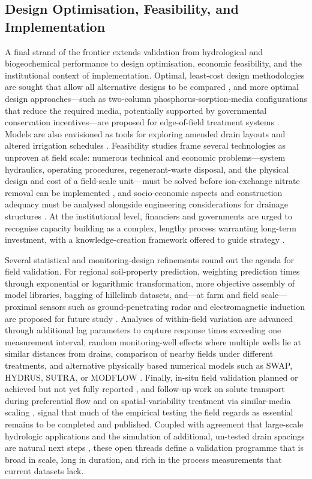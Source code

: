 \subsection{Design Optimisation, Feasibility, and Implementation}

A final strand of the frontier extends validation from hydrological and biogeochemical performance to design optimisation, economic feasibility, and the institutional context of implementation. Optimal, least-cost design methodologies are sought that allow all alternative designs to be compared \parencite{Bakour2021}, and more optimal design approaches---such as two-column phosphorus-sorption-media configurations that reduce the required media, potentially supported by governmental conservation incentives---are proposed for edge-of-field treatment systems \parencite{Hauda2020}. Models are also envisioned as tools for exploring amended drain layouts and altered irrigation schedules \parencite{Alzraiee2013b}. Feasibility studies frame several technologies as unproven at field scale: numerous technical and economic problems---system hydraulics, operating procedures, regenerant-waste disposal, and the physical design and cost of a field-scale unit---must be solved before ion-exchange nitrate removal can be implemented \parencite{MAGETTE1990}, and socio-economic aspects and construction adequacy must be analysed alongside engineering considerations for drainage structures \parencite{Bozic2014}. At the institutional level, financiers and governments are urged to recognise capacity building as a complex, lengthy process warranting long-term investment, with a knowledge-creation framework offered to guide strategy \parencite{Ritzema2008}.

Several statistical and monitoring-design refinements round out the agenda for field validation. For regional soil-property prediction, weighting prediction times through exponential or logarithmic transformation, more objective assembly of model libraries, bagging of hillclimb datasets, and---at farm and field scale---proximal sensors such as ground-penetrating radar and electromagnetic induction are proposed for future study \parencite{Moller2018}. Analyses of within-field variation are advanced through additional lag parameters to capture response times exceeding one measurement interval, random monitoring-well effects where multiple wells lie at similar distances from drains, comparison of nearby fields under different treatments, and alternative physically based numerical models such as SWAP, HYDRUS, SUTRA, or MODFLOW \parencite{vandeCraats2025}. Finally, in-situ field validation planned or achieved but not yet fully reported \parencite{Hartani2001}, and follow-up work on solute transport during preferential flow and on spatial-variability treatment via similar-media scaling \parencite{Mohanty1997}, signal that much of the empirical testing the field regards as essential remains to be completed and published. Coupled with agreement that large-scale hydrologic applications and the simulation of additional, un-tested drain spacings are natural next steps \parencite{Talukolaee2022}, these open threads define a validation programme that is broad in scale, long in duration, and rich in the process measurements that current datasets lack.